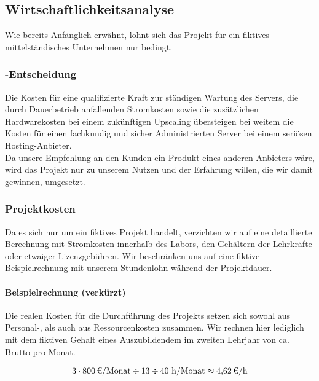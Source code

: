 \subsection{Wirtschaftlichkeitsanalyse}
\label{sec:Wirtschaftlichkeitsanalyse}
    Wie bereits Anfänglich erwähnt, lohnt sich das Projekt für ein fiktives mittelständisches Unternehmen nur bedingt.

\subsubsection{-Entscheidung}
\label{sec:MakeOrBuyEntscheidung}
    Die Kosten für eine qualifizierte Kraft zur ständigen Wartung des Servers, die durch Dauerbetrieb anfallenden Stromkosten sowie die zusätzlichen Hardwarekosten bei einem zukünftigen Upscaling übersteigen bei weitem die Kosten für einen fachkundig und sicher Administrierten Server bei einem seriösen Hosting-Anbieter.\\
    Da unsere Empfehlung an den Kunden ein Produkt eines anderen Anbieters wäre, wird das Projekt nur zu unserem Nutzen und der Erfahrung willen, die wir damit gewinnen, umgesetzt.

\subsubsection{Projektkosten}
\label{sec:Projektkosten}
    Da es sich nur um ein fiktives Projekt handelt, verzichten wir auf eine detaillierte Berechnung mit Stromkosten innerhalb des Labors, den Gehältern der Lehrkräfte oder etwaiger Lizenzgebühren. Wir beschränken uns auf eine fiktive Beispielrechnung mit unserem Stundenlohn während der Projektdauer.

\paragraph{Beispielrechnung (verkürzt)}
Die realen Kosten für die Durchführung des Projekts setzen sich sowohl aus Personal-, als auch aus Ressourcenkosten zusammen. Wir rechnen hier lediglich mit dem fiktiven Gehalt eines Auszubildendem im zweiten Lehrjahr von ca.  Brutto pro Monat. 

\begin{eqnarray}
3\cdot \eur{800}\mbox{/Monat} \div {13} \div 40 \mbox{ h/Monat} \approx \eur{4,62}\mbox{/h}
\end{eqnarray}

